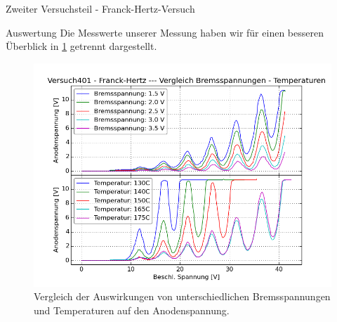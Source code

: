 \documentclass[pdftex, a4paper,11pt, twoside, ngerman]{report}
\begin{document}
\begin{chapter}{Zweiter Versuchsteil - Franck-Hertz-Versuch}
    \begin{section}{Auswertung}
      \label{chp:FH:sec:Auswertung}
      Die Messwerte unserer Messung haben wir für einen besseren Überblick in
      \cref{fig:FHvergleich} getrennt dargestellt.
      \begin{figure}[ht]
        \centering
        \includegraphics[width=.95\textwidth]
    {Figures/Versuch401-Franck-Hertz-VergleichBremsspannungen-Temperaturen.png}
        \caption{Vergleich der Auswirkungen von unterschiedlichen
            Bremsspannungen und Temperaturen auf den Anodenspannung.}
        \label{fig:FHvergleich}
      \end{figure}
      
      
      

\end{section}
\end{chapter}
\end{document}
